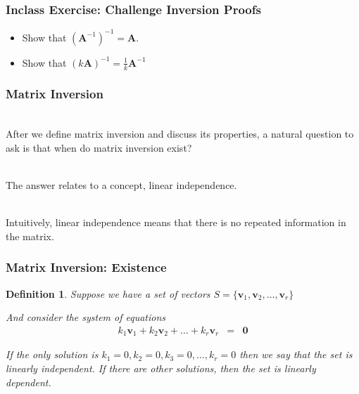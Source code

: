 \documentclass[handout]{beamer}
\newtheorem{defn}{Definition}
\numberwithin{equation}{section}
\begin{document}
\begin{frame}
\frametitle{Inclass Exercise: Challenge Inversion Proofs}

\begin{itemize}
\item[-] Show that $(\boldsymbol{A}^{-1})^{-1}  = \boldsymbol{A}$.  
\item[-] Show that $(k \boldsymbol{A})^{-1} = \frac{1}{k} \boldsymbol{A}^{-1}$
\end{itemize}

\end{frame}



\begin{frame}
\frametitle{Matrix Inversion}

\ \\After we define matrix inversion and discuss its properties, a natural question to ask is that when do matrix inversion exist? \pause

\ \\The answer relates to a concept, linear independence. \pause

\ \\Intuitively, linear independence means that there is no repeated information in the matrix.

\end{frame}



\begin{frame}
\frametitle{Matrix Inversion: Existence}


\begin{defn} Suppose we have a set of vectors $S =\{ \boldsymbol{v}_{1}, \boldsymbol{v}_{2}, \hdots, \boldsymbol{v}_{r}\}$ 

And consider the system of equations 
\begin{eqnarray}
k_{1} \boldsymbol{v}_{1} + k_{2} \boldsymbol{v}_{2} + \hdots + k_{r} \boldsymbol{v}_{r} & = & \boldsymbol{0} \nonumber 
\end{eqnarray}

If the only solution is $k_{1} = 0, k_{2} = 0, k_{3} = 0, \hdots, k_{r} = 0$ then we say that the set is linearly independent.  If there are other solutions, then the set is linearly dependent.

\end{defn}

\end{frame}
\end{document}
